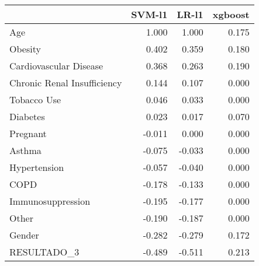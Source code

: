 \begin{tabular}{lrrr}
\toprule
{} &  SVM-l1 &  LR-l1 &  xgboost \\
\midrule
Age                         &   1.000 &  1.000 &    0.175 \\
Obesity                     &   0.402 &  0.359 &    0.180 \\
Cardiovascular Disease      &   0.368 &  0.263 &    0.190 \\
Chronic Renal Insufficiency &   0.144 &  0.107 &    0.000 \\
Tobacco Use                 &   0.046 &  0.033 &    0.000 \\
Diabetes                    &   0.023 &  0.017 &    0.070 \\
Pregnant                    &  -0.011 &  0.000 &    0.000 \\
Asthma                      &  -0.075 & -0.033 &    0.000 \\
Hypertension                &  -0.057 & -0.040 &    0.000 \\
COPD                        &  -0.178 & -0.133 &    0.000 \\
Immunosuppression           &  -0.195 & -0.177 &    0.000 \\
Other                       &  -0.190 & -0.187 &    0.000 \\
Gender                      &  -0.282 & -0.279 &    0.172 \\
RESULTADO\_3                 &  -0.489 & -0.511 &    0.213 \\
\bottomrule
\end{tabular}

